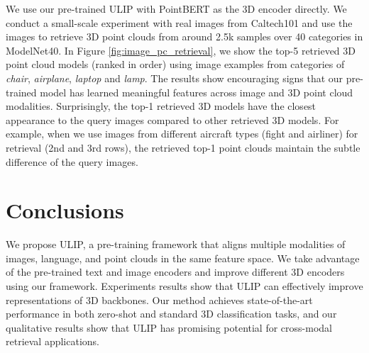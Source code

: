\documentclass[10pt,twocolumn,letterpaper]{article}
\begin{document}
We use our pre-trained ULIP with PointBERT as the 3D encoder directly. We conduct a small-scale experiment with real images from Caltech101 \cite{fei2004learning} and use the images to retrieve 3D point clouds from around 2.5k samples over 40 categories in ModelNet40. In Figure \ref{fig:image_pc_retrieval}, we show the top-5 retrieved 3D point cloud models (ranked in order) using image examples from categories of \emph{chair}, \emph{airplane}, \emph{laptop} and \emph{lamp}. The results show encouraging signs that our pre-trained model has learned meaningful features across image and 3D point cloud modalities. Surprisingly, the top-1 retrieved 3D models have the closest appearance to the query images compared to other retrieved 3D models. For example, when we use images from different aircraft types (fight and airliner) for retrieval (2nd and 3rd rows), the retrieved top-1 point clouds maintain the subtle difference of the query images.


\section{Conclusions}
\label{sec:conclusion}
We propose ULIP, a pre-training framework that aligns multiple modalities of images, language, and point clouds in the same feature space. We take advantage of the pre-trained text and image encoders and improve different 3D encoders using our framework. Experiments results show that ULIP can effectively improve representations of 3D backbones. Our method achieves state-of-the-art performance in both zero-shot and standard 3D classification tasks, and our qualitative results show that ULIP has promising potential for cross-modal retrieval applications.


\end{document}
